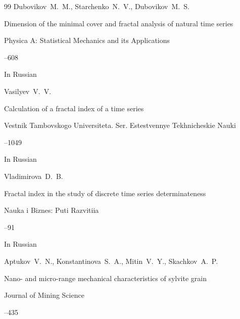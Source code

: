 \begin{thebibliography}{99}
\by Dubovikov~M.~M., Starchenko~N.~V., Dubovikov~M.~S.

\paper Dimension of the minimal cover and fractal analysis of natural time series 

\jour Physica A: Statistical Mechanics and its Applications




--608







\lang In Russian

\by Vasilyev~V.~V.

\paper Calculation of a fractal index of a time series

\jour Vestnik Tambovskogo Universiteta. Ser. Estestvennye Tekhnicheskie Nauki




--1049

\lang In Russian




\by Vladimirova~D.~B.

\paper Fractal index in the study of discrete time series determinateness

\jour Nauka i Biznes: Puti Razvitiia



--91

\lang In Russian




\by Aptukov~V.~N., Konstantinova~S.~A., Mitin~V.~Y., Skachkov~A.~P.

\paper Nano- and micro-range mechanical characteristics of sylvite grain

\jour Journal of Mining Science 




--435



\end{thebibliography}
